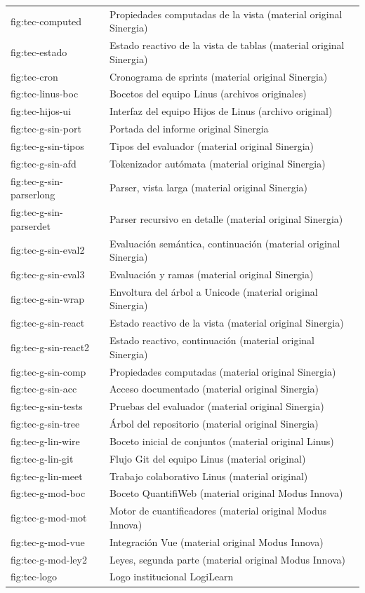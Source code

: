 \documentclass[11pt,a4paper,openany]{book}
\begin{document}
\begin{center}
\begin{longtable}{ll}
fig:tec-computed & Propiedades computadas de la vista (material original Sinergia) \\
fig:tec-estado & Estado reactivo de la vista de tablas (material original Sinergia) \\
fig:tec-cron & Cronograma de sprints (material original Sinergia) \\
fig:tec-linus-boc & Bocetos del equipo Linus (archivos originales) \\
fig:tec-hijos-ui & Interfaz del equipo Hijos de Linus (archivo original) \\
fig:tec-g-sin-port & Portada del informe original Sinergia \\
fig:tec-g-sin-tipos & Tipos del evaluador (material original Sinergia) \\
fig:tec-g-sin-afd & Tokenizador aut\'omata (material original Sinergia) \\
fig:tec-g-sin-parserlong & Parser, vista larga (material original Sinergia) \\
fig:tec-g-sin-parserdet & Parser recursivo en detalle (material original Sinergia) \\
fig:tec-g-sin-eval2 & Evaluaci\'on sem\'antica, continuaci\'on (material original Sinergia) \\
fig:tec-g-sin-eval3 & Evaluaci\'on y ramas (material original Sinergia) \\
fig:tec-g-sin-wrap & Envoltura del \'arbol a Unicode (material original Sinergia) \\
fig:tec-g-sin-react & Estado reactivo de la vista (material original Sinergia) \\
fig:tec-g-sin-react2 & Estado reactivo, continuaci\'on (material original Sinergia) \\
fig:tec-g-sin-comp & Propiedades computadas (material original Sinergia) \\
fig:tec-g-sin-acc & Acceso documentado (material original Sinergia) \\
fig:tec-g-sin-tests & Pruebas del evaluador (material original Sinergia) \\
fig:tec-g-sin-tree & \'Arbol del repositorio (material original Sinergia) \\
fig:tec-g-lin-wire & Boceto inicial de conjuntos (material original Linus) \\
fig:tec-g-lin-git & Flujo Git del equipo Linus (material original) \\
fig:tec-g-lin-meet & Trabajo colaborativo Linus (material original) \\
fig:tec-g-mod-boc & Boceto QuantifiWeb (material original Modus Innova) \\
fig:tec-g-mod-mot & Motor de cuantificadores (material original Modus Innova) \\
fig:tec-g-mod-vue & Integraci\'on Vue (material original Modus Innova) \\
fig:tec-g-mod-ley2 & Leyes, segunda parte (material original Modus Innova) \\
fig:tec-logo & Logo institucional LogiLearn \\
\bottomrule
\end{longtable}
\normalsize
\end{center}
\end{document}
